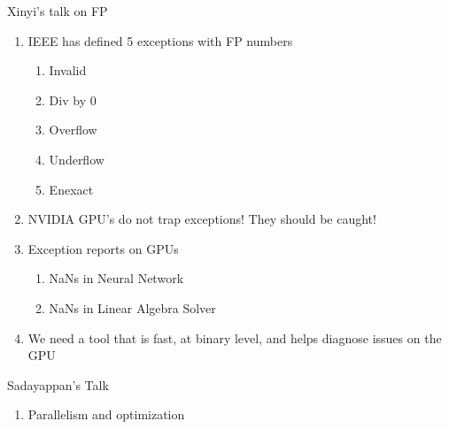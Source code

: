 \documentclass[a4paper, 11pt, oneside]{researchjournal} %
\begin{document}
\begin{enumerate}
     Xinyi's talk on FP
     \begin{enumerate}
         \item IEEE has defined 5 exceptions with FP numbers 
         \begin{enumerate}
             \item Invalid
             \item Div by 0
             \item Overflow
             \item Underflow
             \item Enexact
         \end{enumerate}
         \item NVIDIA GPU's do not trap exceptions! They should be caught!
         \item Exception reports on GPUs
         \begin{enumerate}
             \item NaNs in Neural Network 
             \item NaNs in Linear Algebra Solver
         \end{enumerate}
         \item We need a tool that is fast, at binary level, and helps diagnose issues on the GPU 
     \end{enumerate}
 \end{enumerate}
Sadayappan's Talk
 \begin{enumerate}
     \item Parallelism and optimization
 \end{enumerate}
 
\end{document}

